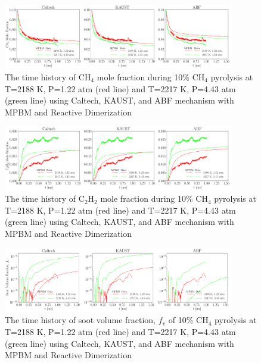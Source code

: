 \begin{figure}[H]
	\centering
	\includegraphics[width=0.9\textwidth]{Figures/Results/Shocktube/Stanford/September/stsh_sepmechs_CH4.pdf}
	\caption{The time history of $\mathrm{CH_4}$ mole fraction during 10\% $\mathrm{CH_4}$ pyrolysis at T=2188 K, P=1.22 atm (red line) and T=2217 K, P=4.43 atm (green line) using Caltech, KAUST, and ABF mechanism with MPBM and Reactive Dimerization}
	\label{fig:shocktubes_sepch4} 
\end{figure}

\begin{figure}[H]
	\centering
	\includegraphics[width=0.9\textwidth]{Figures/Results/Shocktube/Stanford/September/stsh_sepmechs_C2H2.pdf}
	\caption{The time history of $\mathrm{C_2H_2}$ mole fraction during 10\% $\mathrm{CH_4}$ pyrolysis at T=2188 K, P=1.22 atm (red line) and T=2217 K, P=4.43 atm (green line) using Caltech, KAUST, and ABF mechanism with MPBM and Reactive Dimerization}
	\label{fig:shocktubes_sepc2h2} 
\end{figure}

\begin{figure}[H]
	\centering
	\includegraphics[width=0.9\textwidth]{Figures/Results/Shocktube/Stanford/September/stsh_sepmechs_vf.pdf}
	\caption{The time history of soot volume fraction, $f_v$ of 10\% $\mathrm{CH_4}$ pyrolysis at T=2188 K, P=1.22 atm (red line) and T=2217 K, P=4.43 atm (green line) using Caltech, KAUST, and ABF mechanism with MPBM and Reactive Dimerization}
	\label{fig:shocktubes_sepvf} 
\end{figure}

